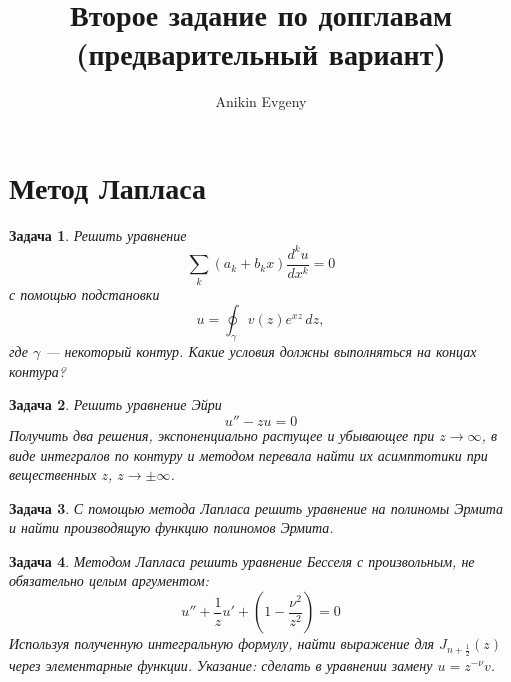\documentclass{article}
\title{Второе задание по допглавам (предварительный вариант)}
\author{Anikin Evgeny}
\newtheorem{problem}{Задача}
\begin{document}
\maketitle
\section{Метод Лапласа}
\begin{problem}
    Решить уравнение 
    \begin{equation}
        \sum_k (a_k + b_k x) \frac{d^k u}{d x^k} = 0
    \end{equation}
    с помощью подстановки 
    \begin{equation}
        u = \oint_\gamma v(z) e^{xz} \,dz,
    \end{equation}
    где $\gamma$ --- некоторый контур. Какие условия должны выполняться на концах 
    контура?
\end{problem}
\begin{problem}
    Решить уравнение Эйри
    \begin{equation}
        u'' - zu = 0
    \end{equation}
    Получить два решения, экспоненциально растущее и убывающее при $z \to \infty$,
    в виде интегралов по контуру и методом
    перевала найти их 
    асимптотики при вещественных $z$, $z \to \pm \infty$.
\end{problem}
\begin{problem}
    С помощью метода Лапласа решить уравнение на полиномы Эрмита и найти производящую
    функцию полиномов Эрмита.
\end{problem}
\begin{problem}
    Методом Лапласа решить уравнение Бесселя с произвольным, не обязательно целым 
    аргументом:
    \begin{equation}
        u'' + \frac{1}{z}u' + \left(1 - \frac{\nu^2}{z^2}\right) = 0
    \end{equation}
    Используя полученную интегральную 
    формулу, найти выражение для $J_{n+\frac{1}{2}}(z)$ через элементарные функции.
    \emph{Указание:} сделать в уравнении замену $u = z^{-\nu} v$.
\end{problem}
\end{document}
